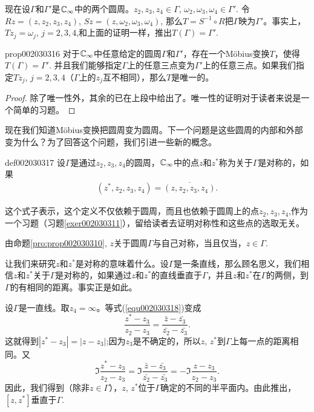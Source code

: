 现在设$\Gamma$和$\Gamma'$是$\mathbb{C}_{\infty}$中的两个圆周。$z_2,z_3,z_4 \in \Gamma$, $\omega_2, \omega_3, \omega_4 \in \Gamma'$. 令$Rz = (z, z_2, z_3, z_4)$, $Sz=(z, \omega_2, \omega_3, \omega_4)$, 那么$T = S^{-1}\circ R$把$\Gamma$映为$\Gamma'$。事实上，$Tz_j = \omega_j$, $j=2,3,4$,和上面的证明一样，推出$T(\Gamma) = \Gamma'$.

\begin{proposition}{}{prop002030316}
对于$\mathbb{C}_{\infty}$中任意给定的圆周$\Gamma$和$\Gamma'$，存在一个M\"obius变换$T$，使得$T(\Gamma) = \Gamma'$. 并且我们能够指定$\Gamma$上的任意三点变为$\Gamma'$上的任意三点。如果我们指定$Tz_j$, $j=2,3,4$（$\Gamma$上的$z_j$互不相同），那么$T$是唯一的。
\end{proposition}

\begin{proof}
除了唯一性外，其余的已在上段中给出了。唯一性的证明对于读者来说是一个简单的习题。
\end{proof}

现在我们知道M\"obius变换把圆周变为圆周。下一个问题是这些圆周的内部和外部变为什么？为了回答这个问题，我们引进一些新的概念。

\begin{definition}{}{def002030317}
设$\Gamma$是通过$z_2, z_3, z_4$的圆周，$\mathbb{C}_{\infty}$中的点$z$和$z^*$称为关于$\Gamma$是对称的，如果
\begin{gather}\label{equ002030318}
(z^*, z_2, z_3, z_4) = \overline{(z, z_2, z_3, z_4)}.
\end{gather}
\end{definition}
这个式子表示，这个定义不仅依赖于圆周，而且也依赖于圆周上的点$z_2, z_3, z_4$,作为一个习题（习题\ref{exer002030311}），留给读者去证明对称性和这些点的选取无关。

由命题\ref{pro:prop002030310}, $z$关于圆周$\Gamma$与自己对称，当且仅当，$z \in \Gamma$.

让我们来研究$z$和$z^*$是对称的意味着什么。设$\Gamma$是一条直线，那么顾名思义，我们相信$z$和$z^*$关于$\Gamma$是对称的，如果通过$z$和$z^*$的直线垂直于$\Gamma$，并且$z$和$z^*$在$\Gamma$的两侧，到$\Gamma$的有相同的距离。事实正是如此。

设$\Gamma$是一直线。取$z_4 = \infty$。等式(\ref{equ002030318})变成
\[
\frac{z^* - z_3}{z_2-z_3} = \frac{\bar{z}-\bar{z_3}}{\bar{z_2} - \bar{z_3}}.
\]
这就得到$|z^* - z_3| = |z - z_3|$;因为$z_3$是不确定的，所以$z$, $z^*$到$\Gamma$上每一点的距离相同。又
\[
\Im{\frac{z^*-z_3}{z_2-z_3}} = \Im{\frac{\bar{z}-\bar{z_3}}{\bar{z_2} - \bar{z_3}}} = -\Im{\frac{z-z_3}{z_2-z_3}}.
\]
因此，我们得到（除非$z \in \Gamma$），$z$, $z^*$位于$\Gamma$确定的不同的半平面内。由此推出，$[z, z^*]$垂直于$\Gamma$.

